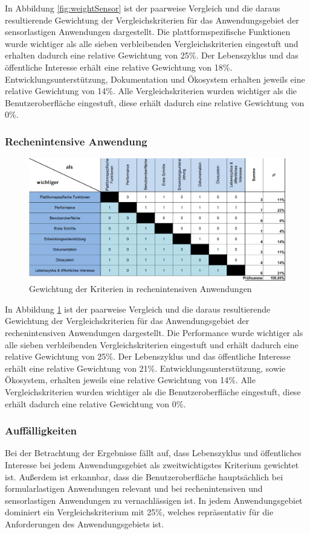 \documentclass[]{lni}
\begin{document}
In Abbildung \ref{fig:weightSensor} ist der paarweise Vergleich und die daraus resultierende Gewichtung der Vergleichskriterien für das Anwendungsgebiet der sensorlastigen Anwendungen dargestellt. Die plattformspezifische Funktionen wurde wichtiger als alle sieben verbleibenden Vergleichskriterien eingestuft und erhalten dadurch eine relative Gewichtung von 25\%. Der Lebenszyklus und das öffentliche Interesse erhält eine relative Gewichtung von 18\%. Entwicklungsunterstützung, Dokumentation und Ökosystem erhalten jeweils eine relative Gewichtung von 14\%. Alle Vergleichskriterien wurden wichtiger als die Benutzeroberfläche eingestuft, diese erhält dadurch eine relative Gewichtung von 0\%.

\subsubsection{Rechenintensive Anwendung}

\begin{figure}[h]
	\centering
	\includegraphics[width=0.85\linewidth]{images/GewichtungRechenintensiv.png}
	\caption{Gewichtung der Kriterien in rechenintensiven Anwendungen}
	\label{fig:weightCalc}
\end{figure}

In Abbildung \ref{fig:weightCalc} ist der paarweise Vergleich und die daraus resultierende Gewichtung der Vergleichskriterien für das Anwendungsgebiet der rechenintensiven Anwendungen dargestellt. Die Performance wurde wichtiger als alle sieben verbleibenden Vergleichskriterien eingestuft und erhält dadurch eine relative Gewichtung von 25\%. Der Lebenszyklus und das öffentliche Interesse erhält eine relative Gewichtung von 21\%. Entwicklungsunterstützung, sowie Ökosystem, erhalten jeweils eine relative Gewichtung von 14\%. Alle Vergleichskriterien wurden wichtiger als die Benutzeroberfläche eingestuft, diese erhält dadurch eine relative Gewichtung von 0\%.

\subsubsection{Auffälligkeiten}
Bei der Betrachtung der Ergebnisse fällt auf, dass Lebenszyklus und öffentliches Interesse bei jedem Anwendungsgebiet als zweitwichtigstes Kriterium gewichtet ist. Außerdem ist erkannbar, dass die Benutzeroberfläche hauptsächlich bei formularlastigen Anwendungen relevant und bei rechenintensiven und sensorlastigen Anwendungen zu vernachlässigen ist. In jedem Anwendungsgebiet dominiert ein Vergleichskriterium mit 25\%, welches repräsentativ für die Anforderungen des Anwendungsgebiets ist.
\end{document}
